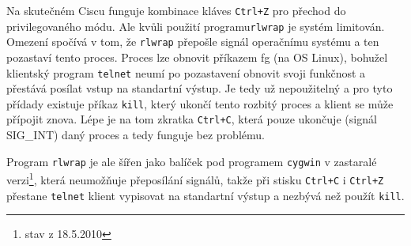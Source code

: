 Na skutečném Ciscu funguje kombinace kláves \verb|Ctrl+Z| pro přechod do privilegovaného módu. Ale kvůli použití programu\verb|rlwrap| je systém limitován. Omezení spočívá v tom, že \verb|rlwrap| přepošle signál operačnímu systému a ten pozastaví tento proces. Proces lze obnovit příkazem fg (na OS Linux), bohužel klientský program \verb|telnet| neumí po pozastavení obnovit svoji funkčnost a přestává posílat vstup na standartní výstup. Je tedy už nepoužitelný a pro tyto přídady existuje příkaz \verb|kill|, který ukončí tento rozbitý proces a klient se může přípojit znova. Lépe je na tom zkratka \verb|Ctrl+C|, která pouze ukončuje (signál SIG\_INT) daný proces a tedy funguje bez problému. 

Program \verb|rlwrap| je ale šířen jako balíček pod programem \verb|cygwin| v zastaralé verzi\footnote{stav z 18.5.2010}, která neumožňuje přeposílání signálů, takže při stisku \verb|Ctrl+C| i \verb|Ctrl+Z| přestane \verb|telnet| klient vypisovat na standartní výstup a nezbývá než použít \verb|kill|.











